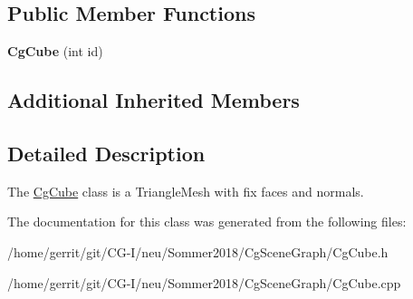 \subsection*{Public Member Functions}
\begin{DoxyCompactItemize}
\item 
\mbox{\label{class_cg_cube_a666f7f108c491b725d2e843be94ac074}} 
{\bfseries Cg\+Cube} (int id)
\end{DoxyCompactItemize}
\subsection*{Additional Inherited Members}


\subsection{Detailed Description}
The \hyperlink{class_cg_cube}{Cg\+Cube} class is a Triangle\+Mesh with fix faces and normals. 

The documentation for this class was generated from the following files\+:\begin{DoxyCompactItemize}
\item 
/home/gerrit/git/\+C\+G-\/\+I/neu/\+Sommer2018/\+Cg\+Scene\+Graph/Cg\+Cube.\+h\item 
/home/gerrit/git/\+C\+G-\/\+I/neu/\+Sommer2018/\+Cg\+Scene\+Graph/Cg\+Cube.\+cpp\end{DoxyCompactItemize}
